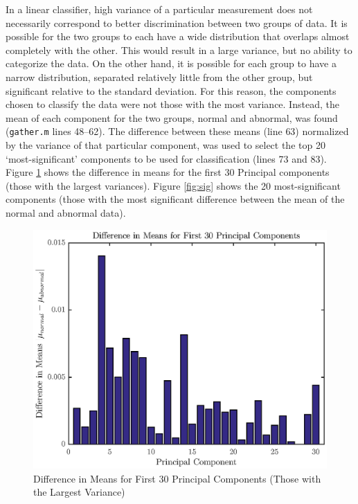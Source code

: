 \documentclass[titlepage,12pt,letter]{article}
\begin{document}
In a linear classifier, high variance of a particular measurement does not
necessarily correspond to better discrimination between two groups of data.  It
is possible for the two groups to each have a wide distribution that overlaps
almost completely with the other.  This would result in a large variance, but no
ability to categorize the data.  On the other hand, it is possible for each
group to have a narrow distribution, separated relatively little from the other
group, but significant relative to the standard deviation.  For this reason, the
components chosen to classify the data were not those with the most variance.
Instead, the mean of each component for the two groups, normal and abnormal, was
found (\verb`gather.m` lines 48--62).  The difference between these means (line
63) normalized by the variance of that particular component, was used to select
the top 20 `most-significant' components to be used for classification (lines 73
and 83).  Figure \ref{fig:diff} shows the difference in means for the first 30
Principal components (those with the largest variances).  Figure \ref{fig:sig}
shows the 20 most-significant components (those with the most significant
difference between the mean of the normal and abnormal data).  

\begin{figure}[htbp]
    \centering
    \includegraphics[height=0.42\textheight]{../figures/train_03}
    \caption{Difference in Means for First 30 Principal Components (Those with
    the Largest Variance)}
    \label{fig:diff}
\end{figure}
\end{document}
